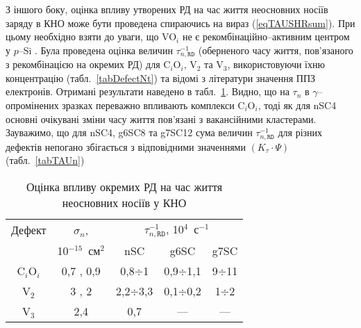 З іншого боку,
оцінка впливу утворених РД на час життя неосновних носіїв заряду в КНО може бути проведена спираючись
на вираз (\ref{eqTAUSHRsum}).
При цьому необхідно взяти до уваги,
що VO$_i$ не є рекомбінаційно--активним центром у $p$--Si \cite{gamma:Kolkov,IrrCzpSi:Benton,IrrCzpSi:Coffa,IrrCzpSi:Ganagona,IrrCzpSi:Vines}.
Була проведена оцінка величин $\tau_{n,\mathtt{RD}}^{-1}$ (оберненого часу життя, пов'язаного з рекомбінацією на окремих РД)
для C$_i$O$_i$, V$_2$ та  V$_3$, використовуючи їхню концентрацію (табл.~\ref{tabDefectNt}) та відомі з літератури значення ППЗ електронів.
Отримані результати наведено в табл.~\ref{tabDefectTAU}.
Видно, що на $\tau_n$ в $\gamma$--опромінених зразках переважно впливають комплекси C$_i$O$_i$, тоді як для nSC4 основні очікувані
зміни часу життя пов'язані з вакансійними кластерами.
Зауважимо, що для nSC4, g6SC8 та g7SC12 сума величин $\tau_{n,\mathtt{RD}}^{-1}$ для різних дефектів
непогано збігається з відповідними значеннями $(K_\tau\cdot\Psi)$ (табл.~\ref{tabTAUn})




\begin{table}[b]
\caption{\label{tabDefectTAU}Оцінка впливу окремих РД на час життя неосновних носіїв у КНО
}
\center
\begin{tabular}{|c|c|c|c|c|}
\hline
Дефект&$\sigma_n$,&\multicolumn{3}{c|}{$\tau_{n,\mathtt{RD}}^{-1}$, 10$^4$~с$^{-1}$}\\ \cline{3-5}
&10$^{-15}$~см$^2$&nSC&g6SC&g7SC\\
\hline
C$_i$O$_i$&0,7 \cite{gamma:Stahl}, 0,9 \cite{gamma:Kolkr}&0,8$\div$1&0,9$\div$1,1&9$\div$11\\ \hline
V$_2$&3 \cite{gamma:Stahl}, 2 \cite{A:Brothe}&2,2$\div$3,3&0,1$\div$0,2&1$\div$2\\ \hline
V$_3$&2,4 \cite{V3:Markevich}&0,7&---&---\\ \hline
\end{tabular}
\end{table}

